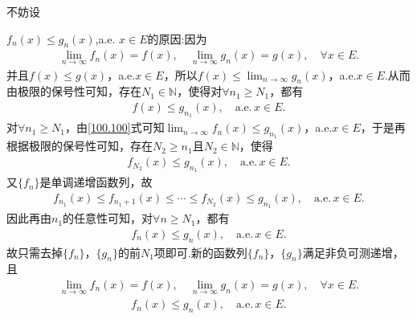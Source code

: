 \documentclass[../../main.tex]{subfiles}%
\begin{document}
\begin{remark}
\hypertarget{不妨设简单函数列保持不变的原因}{不妨设}$f_n(x)\leqslant g_n(x)$,a.e. $x\in E$的原因:因为
\begin{align}
\lim_{n\rightarrow \infty}f_n(x) = f(x),\quad \lim_{n\rightarrow \infty}g_n(x) = g(x),\quad \forall x\in E.\label{100.100}
\end{align}
并且$f(x) \leqslant g(x)$，a.e.$x\in E$，所以$f(x) \leqslant \lim_{n\rightarrow \infty}g_n(x)$，a.e.$x\in E$.从而由极限的保号性可知，存在$N_1\in \mathbb{N}$，使得对$\forall n_1\geqslant N_1$，都有
\begin{align*}
f(x) \leqslant g_{n_1}(x),\quad \text{a.e.}\,x\in E.
\end{align*}
对$\forall n_1\geqslant N_1$，由\eqref{100.100}式可知$\lim_{n\rightarrow \infty}f_n(x) \leqslant g_{n_1}(x)$，a.e.$x\in E$，于是再根据极限的保号性可知，存在$N_2\geqslant n_1$且$N_2\in \mathbb{N}$，使得
\begin{align*}
f_{N_2}(x) \leqslant g_{n_1}(x),\quad \text{a.e.}\,x\in E.
\end{align*}
又$\{ f_n \}$是单调递增函数列，故
\begin{align*}
f_{n_1}(x) \leqslant f_{n_1+1}(x) \leqslant \cdots \leqslant f_{N_2}(x) \leqslant g_{n_1}(x),\quad \text{a.e.}\,x\in E.
\end{align*}
因此再由$n_1$的任意性可知，对$\forall n\geqslant N_1$，都有
\begin{align*}
f_n(x) \leqslant g_n(x),\quad \text{a.e.}\,x\in E.
\end{align*}
故只需去掉$\{ f_n \}$，$\{ g_n \}$的前$N_1$项即可.新的函数列$\{ f_n \}$，$\{ g_n \}$满足非负可测递增，且
\begin{align*}
\lim_{n\rightarrow \infty}f_n(x) = f(x),\quad \lim_{n\rightarrow \infty}g_n(x) = g(x),\quad \forall x\in E.
\end{align*}
\begin{align*}
f_n(x) \leqslant g_n(x),\quad \text{a.e.}\,x\in E.
\end{align*}
\end{remark}
\end{document}
